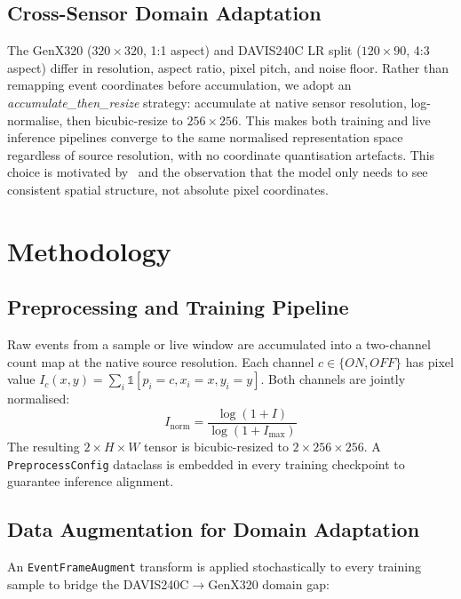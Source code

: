 \documentclass[journal]{IEEEtran}
\begin{document}
\subsection{Cross-Sensor Domain Adaptation}

The GenX320 ($320{\times}320$, 1:1 aspect) and DAVIS240C LR split ($120{\times}90$, 4:3 aspect) differ in resolution, aspect ratio, pixel pitch, and noise floor. Rather than remapping event coordinates before accumulation, we adopt an \textit{accumulate\_then\_resize} strategy: accumulate at native sensor resolution, log-normalise, then bicubic-resize to $256{\times}256$. This makes both training and live inference pipelines converge to the same normalised representation space regardless of source resolution, with no coordinate quantisation artefacts. This choice is motivated by~\cite{bi2019} and the observation that the model only needs to see consistent spatial structure, not absolute pixel coordinates.

\section{Methodology}

\subsection{Preprocessing and Training Pipeline}

Raw events from a sample or live window are accumulated into a two-channel count map at the native source resolution. Each channel $c \in \{ON, OFF\}$ has pixel value $I_c(x,y) = \sum_i \mathbb{1}[p_i = c, x_i = x, y_i = y]$. Both channels are jointly normalised:
\begin{equation}
    I_{\text{norm}} = \frac{\log(1 + I)}{\log(1 + I_{\max})}
\end{equation}
The resulting $2{\times}H{\times}W$ tensor is bicubic-resized to $2{\times}256{\times}256$. A \texttt{PreprocessConfig} dataclass is embedded in every training checkpoint to guarantee inference alignment.

\subsection{Data Augmentation for Domain Adaptation}

An \texttt{EventFrameAugment} transform is applied stochastically to every training sample to bridge the DAVIS240C$\to$GenX320 domain gap:
\end{document}
